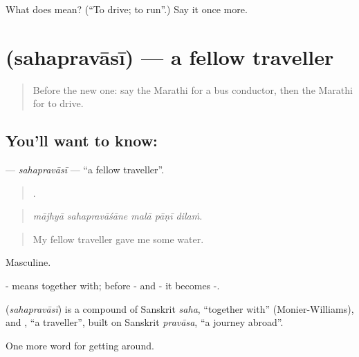\begin{tcolorbox}[breakable,colback=teal!4,colframe=teal!35!black,title={Before you move on}]
What does  mean? (\textquotedblleft{}To drive; to run\textquotedblright{}.) Say it once more.
\end{tcolorbox}
\section[\texorpdfstring{\mr{सहप्रवासी} (sahapravāsī)}{सहप्रवासी (sahapravāsī)}]{ (sahapravāsī) — a fellow traveller}

\label{lesson:MR-C399-sahapravasi}



\begin{quote}
Before the new one: say the Marathi for a bus conductor, then the Marathi for to drive.
\end{quote}

\subsection*{You'll want to know: }
\textbf{} — \emph{sahapravāsī} — \textquotedblleft{}a fellow traveller\textquotedblright{}.

\begin{quote}
    .
\end{quote}

\begin{quote}
\emph{mājhyā sahapravāśāne malā pāṇī dilaṁ.}
\end{quote}

\begin{quote}
My fellow traveller gave me some water.
\end{quote}

Masculine.

- means together with; before - and - it becomes -.

\begin{cousinweb}
\textbf{} (\emph{sahapravāsī}) is a compound of Sanskrit \emph{saha}, \textquotedblleft{}together with\textquotedblright{} (Monier-Williams), and \textbf{}, \textquotedblleft{}a traveller\textquotedblright{}, built on Sanskrit \emph{pravāsa}, \textquotedblleft{}a journey abroad\textquotedblright{}.
\end{cousinweb}

\begin{grammarlens}[title={What you've built}]
One more word for getting around.
\end{grammarlens}


